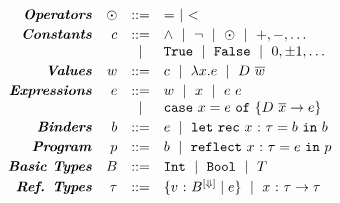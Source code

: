 
$$
\begin{array}{rrcl}
\emphbf{Operators}
  & \odot
  & ::= & = \spmid  <
\\[0.03in]

\emphbf{Constants}
  & c
  & ::=
  & \land \spmid \lnot \spmid \odot \spmid +,-,\dots  \\
  && \spmid & \etrue\spmid \efalse \spmid 0, \pm 1, \dots
\\[0.03in]

\emphbf{Values}
  & w & ::=&  c
             \spmid \efun{x}{\typ}{e} \spmid D\ \overline{w}
\\[0.03in]

\emphbf{Expressions}
  & e & ::=    & w \spmid x \spmid \eapp{e}{e}      \\
  &   & \spmid & \ecase{x}{e}{\dc}{\overline{x}}{e}
\\[0.03in]

\emphbf{Binders}
  & \bd & ::= & e \spmid \eletb{x}{\gtyp}{\bd}{\bd}
\\[0.03in]

\emphbf{Program}
  & \prog & ::= & \bd \spmid \erefb{x}{\gtyp}{e}{\prog}
\\[0.03in]


\emphbf{Basic Types}
  & \btyp
  & ::=
  & \tint \spmid \tbool \spmid T
\\[0.03in]

\emphbf{Ref. Types}
  & \typ
  & ::=   & \tref{v}{\btyp^{[\tlabel]}}{\reft} \spmid \tfun{x}{\typ}{\typ}
\\[0.05in]
\end{array}
$$
\caption{\textbf{Syntax of \corelan}}
\label{fig:syntax}


